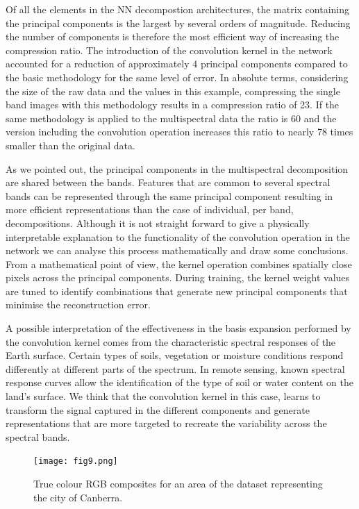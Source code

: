 \documentclass[essd, manuscript]{copernicus}
\begin{document}
Of all the elements in the NN decompostion architectures, the matrix containing the principal components is the largest by several orders of magnitude. Reducing the number of components is therefore the most efficient way of increasing the compression ratio. The introduction of the convolution kernel in the network accounted for a reduction of approximately 4 principal components compared to the basic methodology for the same level of error. In absolute terms, considering the size of the raw data and the values in this example, compressing the single band images with this methodology results in a compression ratio of 23. If the same methodology is applied to the multispectral data the ratio is 60 and the version including the convolution operation increases this ratio to nearly 78 times smaller than the original data.

As we pointed out, the principal components in the multispectral decomposition are shared between the bands. Features that are common to several spectral bands can be represented through the same principal component resulting in more efficient representations than the case of individual, per band, decompositions. Although it is not straight forward to give a physically interpretable explanation to the functionality of the convolution operation in the network we can analyse this process mathematically and draw some conclusions. From a mathematical point of view, the kernel operation combines spatially close pixels across the principal components. During training, the kernel weight values are tuned to identify combinations that generate new principal components that minimise the reconstruction error. 

A possible interpretation of the effectiveness in the basis expansion performed by the convolution kernel comes from the characteristic spectral responses of the Earth surface. Certain types of soils, vegetation or moisture conditions respond differently at different parts of the spectrum. In remote sensing, known spectral response curves allow the identification of the type of soil or water content on the land's surface. We think that the convolution kernel in this case, learns to transform the signal captured in the different components and generate representations that are more targeted to recreate the variability across the spectral bands. 

\begin{figure}
    \texttt{[image: fig9.png]}
    \caption{True colour RGB composites for an area of the dataset representing the city of Canberra.}%
    \label{compression_cmp}%
\end{figure}
\end{document}
